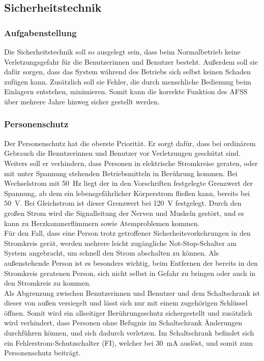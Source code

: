 \subsection{Sicherheitstechnik}
\subsubsection{Aufgabenstellung}
Die Sicherheitstechnik soll so ausgelegt sein, dass beim Normalbetrieb keine Verletzungsgefahr für die Benutzerinnen und Benutzer besteht. Außerdem soll sie dafür sorgen, dass das System während des Betriebs sich selbst keinen Schaden zufügen kann. Zusätzlich soll sie Fehler, die durch menschliche Bedienung beim Einlagern entstehen, minimieren. Somit kann die korrekte Funktion des AFSS über mehrere Jahre hinweg sicher gestellt werden.

\subsubsection{Personenschutz}\label{sc: Personenschutz}
Der Personenschutz hat die oberste Priorität. Er sorgt dafür, dass bei ordinärem Gebrauch die Benutzerinnen und Benutzer vor Verletzungen geschützt sind. Weiters soll er verhindern, dass Personen in elektrische Stromkreise geraten, oder mit unter Spannung stehenden Betriebsmitteln in Berührung kommen. Bei Wechselstrom mit \qty{50}{\hertz} liegt der in den Vorschriften festgelegte Grenzwert der Spannung, ab dem ein lebensgefährlicher Körperstrom fließen kann, bereits bei \qty{50}{\volt}. Bei Gleichstrom ist dieser Grenzwert bei \qty{120}{\volt} festgelegt.\cite{SeyrRösch} Durch den großen Strom wird die Signalleitung der Nerven und Muskeln gestört, und es kann zu Herzkammerflimmern sowie Atemproblemen kommen.\cite{Gefahr_el_Strom}\\
Für den Fall, dass eine Person trotz getroffener Sicherheitsvorkehrungen in den Stromkreis gerät, werden mehrere leicht zugängliche Not-Stop-Schalter am System angebracht, um schnell den Strom abschalten zu können. Als außenstehende Person ist es besonders wichtig, beim Entfernen der bereits in den Stromkreis geratenen Person, sich nicht selbst in Gefahr zu bringen oder auch in den Stromkreis zu kommen.\\
Als Abgrenzung zwischen Benutzerinnen und Benutzer und dem Schaltschrank ist dieser von außen versiegelt und lässt sich nur mit einem zugehörigen Schlüssel öffnen. Somit wird ein allseitiger Berührungsschutz sichergestellt und zusätzlich wird verhindert, dass Personen ohne Befugnis im Schaltschrank Änderungen durchführen können, und sich dadurch verletzen. Im Schaltschrank befindet sich ein Fehlerstrom-Schutzschalter (FI), welcher bei \qty{30}{\milli\ampere} auslöst, und somit zum Personenschutz beiträgt.

